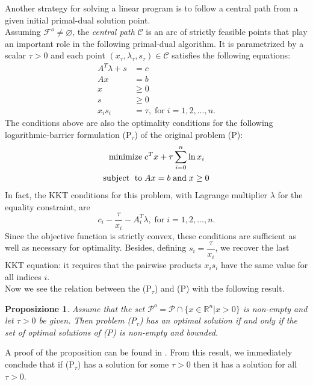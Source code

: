 \documentclass[a4paper,10 pt,titlepage,twoside]{book}
\theoremstyle{plain}
\newtheorem{prop}[thm]{Proposizione}
\theoremstyle{definition}
\theoremstyle{remark}
\begin{document}
Another strategy for solving a linear program is to follow a central path from a given initial primal-dual solution point.\\ Assuming $\mathcal{F}^{o}\neq \varnothing$, the \textit{central path} $\mathcal{C}$ is an arc of strictly feasible points that play an important role in the following primal-dual algorithm. It is parametrized by a scalar $\tau  > 0$ and each point $(x_{\tau}, \lambda_{\tau}, s_{\tau})\in \mathcal{C}$ satisfies the following equations:
\begin{align}
A^{T}\lambda+s&=c\\
Ax&=b\\\label{KKT2}
x&\geq 0\\
s&\geq 0\\
x_{i}s_{i}&= \tau,\; \text{for}\;i= 1,2,...,n.\label{(Tao)}
\end{align} 
The conditions above are also the optimality conditions for the following logarithmic-barrier formulation (P$_{\tau}$) of the original problem (P):
\begin{equation}\label{log}
\begin{split}
\text{minimize\;} &c^{T}x + \tau\sum_{i=0}^{n}\ln{x_{i}}\\
\text{subject\; to\;}&Ax = b\;\text{and\;} x\geq0
\end{split}
\end{equation}
In fact, the KKT conditions for this problem, with Lagrange multiplier $\lambda$ for the equality constraint, are
\begin{equation*}
c_{i} - \dfrac{\tau}{x_{i}} - A^{T}_{i}\lambda,\; \text{for}\;i = 1,2,...,n.
\end{equation*}  
Since the objective function is strictly convex, these conditions are sufficient as well as necessary for optimality. Besides, defining $s_{i} = \dfrac{\tau}{x_{i}}$, we recover the last KKT equation: it requires that the pairwise products $x_{i}s_{i}$ have the same value for all indices $i$.\\
Now we see the relation between the (P$_{\tau}$) and (P) with the following result.
\begin{prop}
	Assume that the set $\mathcal{P}^{o} = \mathcal{P}\cap\{x\in\mathbb{R}^{n}| x> 0\}$ is non-empty and let $\tau>0$ be given. Then problem (P$_{\tau}$) has an optimal solution if and only if the set of optimal solutions of (P) is non-empty and bounded.
\end{prop}
A proof of the proposition can be found in \cite{meg}. From this result, we immediately conclude that if (P$_{\tau}$) has a solution for some $\tau>0$ then it has a solution for all $\tau>0$.
\end{document}
